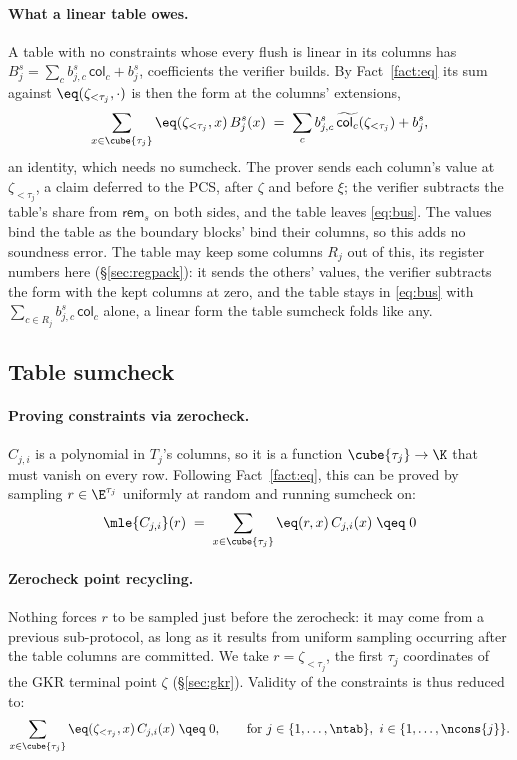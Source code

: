 \paragraph{What a linear table owes.} A table with no constraints whose every flush is linear in its columns has $B^{s}_j=\sum_c b^{s}_{j,c}\,\mathsf{col}_c+b^{s}_{j}$, coefficients the verifier builds. By Fact~\ref{fact:eq} its sum against $\eq(\zeta_{<\tau_j},\cdot)$ is then the form at the columns' extensions,
\[
  \sum_{x\in\cube{\tau_j}}\eq(\zeta_{<\tau_j},x)\,B^{s}_j(x)\;=\;\sum_c b^{s}_{j,c}\,\widetilde{\mathsf{col}_c}(\zeta_{<\tau_j})+b^{s}_{j},
\]
an identity, which needs no sumcheck. The prover sends each column's value at $\zeta_{<\tau_j}$, a claim deferred to the PCS, after $\zeta$ and before $\xi$; the verifier subtracts the table's share from $\mathsf{rem}_{s}$ on both sides, and the table leaves \eqref{eq:bus}. The values bind the table as the boundary blocks' bind their columns, so this adds no soundness error. The table may keep some columns $R_j$ out of this, its register numbers here (\S\ref{sec:regpack}): it sends the others' values, the verifier subtracts the form with the kept columns at zero, and the table stays in \eqref{eq:bus} with $\sum_{c\in R_j}b^{s}_{j,c}\,\mathsf{col}_c$ alone, a linear form the table sumcheck folds like any.

\subsection{Table sumcheck}\label{sec:air}

\paragraph{Proving constraints via zerocheck.} $C_{j,i}$ is a polynomial in $T_j$'s columns, so it is a function $\cube{\tau_j}\to\K$ that must vanish on every row. Following Fact~\ref{fact:eq}, this can be proved by sampling $r\in\E^{\tau_j}$ uniformly at random and running sumcheck on:
\[
  \mle{C_{j,i}}(r)\;=\;\sum_{x\in\cube{\tau_j}}\eq(r,x)\,C_{j,i}(x)\;\qeq\;0
\]

\paragraph{Zerocheck point recycling.} Nothing forces $r$ to be sampled just before the zerocheck: it may come from a previous sub-protocol, as long as it results from uniform sampling occurring after the table columns are committed. We take $r=\zeta_{<\tau_j}$, the first $\tau_j$ coordinates of the GKR terminal point $\zeta$ (\S\ref{sec:gkr}). Validity of the constraints is thus reduced to:
\begin{equation}\label{eq:cons}
  \sum_{x\in\cube{\tau_j}}\eq(\zeta_{<\tau_j},x)\,C_{j,i}(x)\;\qeq\;0,
  \qquad \text{for } j\in\{1,\dots,\ntab\},\ i\in\{1,\dots,\ncons{j}\}.
\end{equation}

